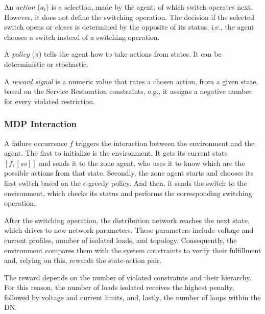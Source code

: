 
An \textit{action} ($a_t$) is a selection, made by the agent, of which switch operates next. 
However, it does not define the switching operation. The decision if the selected switch opens or 
closes is determined by the opposite of its status, i.e., the agent chooses a switch instead of a 
switching operation. 


A \textit{policy} ($\pi$) tells the agent how to take actions from states. It can be 
deterministic or stochastic. 


A \textit{reward signal} is a numeric value that rates a chosen action, from a given state, 
based on the Service Restoration constraints, e.g., it assigns a negative number for every 
violated restriction.

\subsubsection{MDP Interaction}



A failure occurrence $f$ triggers the interaction between the environment and the agent.
The first to initialize is the environment. It gets its current state $[f,[ss]]$ and sends it to the 
zone agent, who uses it to know which are the possible actions from that state.
Secondly, the zone agent starts and chooses its first switch based on the $\epsilon$-greedy policy.
And then, it sends the switch to the environment, which checks its status and performs the 
corresponding switching operation. 

After the switching operation, the distribution network reaches the next state, which 
drives to new network parameters. These parameters include voltage and current profiles, 
number of isolated loads, and topology. Consequently, the environment compares them 
with the system constraints to verify their fulfillment and, relying on this, rewards 
the state-action pair. 

The reward depends on the number of violated constraints and their hierarchy. For this 
reason, the number of loads isolated receives the highest penalty, followed by voltage and 
current limits, and, lastly, the number of loops within the DN. 


